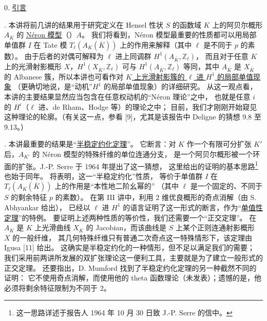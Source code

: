 0. \underline{引言}

. 本讲将前几讲的结果用于研究定义在 Hensel 性状 $S$ 的函数域 $K$ 上的阿贝尔概形 $A_K$ 的
\underline{N\'eron 模型}（）$A$。
我们将看到，N\'eron 模型最重要的性质都可以用局部单值群 $I$ 在 Tate 模
$T_\ell(A_K(\overline K))$ 上的作用来解释（其中 $\ell$ 是不同于 $p$ 的素数）。
由于后者的对偶可解释为 $\ell$ 进上同调群 $H^1(A_{\overline K},\mathbb Z_\ell)$，
而且对于任意 $K$ 上的光滑射影概形 $X$，$H^1(X_{\overline K},\mathbb Z_\ell)$
可与 $H^1(A_{\overline K},\mathbb Z_\ell)$ 等同，其中 $A_{\overline K}$ 是
$X_{\overline K}$ 的 Albanese 簇，所以本讲也可看作对
\underline{$K$ 上光滑射影簇的 $\ell$ 进 $H^1$ 的局部单值现象}
（更确切地说，是“动机”$H^1$ 的局部单值现象）的详细研究。
从这一观点看，本讲的主要结果显然应当包含在任意权动机的“N\'eron 理论”之中，
也就是任意 $i$ 的 $H^i$（$\ell$ 进、de Rham、Hodge 等）的理论之中；
目前，我们才刚刚开始窥见这种理论的轮廓。（有关这一点，参看 [9]，尤其是该报告中 Deligne 的猜想 9.8 至 9.13。）

. 本讲最重要的结果是“\underline{半稳定约化定理}”。
它断言：对 $K$ 作一个有限可分扩张 $K'$ 后，$A_{K'}$ 的 N\'eron 模型的特殊纤维的单位连通分支，
是一个阿贝尔概形被一个环面的扩张。J.-P. Serre 于 1964 年提出了这一猜想，
这里给出的证明的基本思路\footnote{这一思路详述于报告人 1964 年 10 月 30 日致 J.-P. Serre 的信中。}
也始于同年。 将表明，这一“半稳定约化”性质，
等价于单值群 $I$ 在 $T_\ell(A_K(\overline K))$ 上的作用是“本性地二阶幺幂的”
（其中 $\ell$ 是一个固定的、不同于 $S$ 的剩余特征 $p$ 的素数）。
在第 III 讲中，利用 $2$ 维优良概形的奇点消解（由 S. Abhyankar 给出），
已经以 $\ell$ 进 $H^1$ 的语言证明了这一形式的断言，作为“\underline{单值性定理}”的特例。
要证明上述两种性质的等价性，我们还需要一个“正交定理”。
在 $A_K$ 是 $K$ 上光滑曲线 $X_K$ 的 Jacobian，而该曲线是 $S$ 上某个正则连通射影概形 $X$ 的一般纤维，
其几何特殊纤维只有普通二次奇点这一特殊情形下，该定理由 Igusa [11] 给出。
这确实是半稳定约化的一种情形，但不足以满足我们的需要；
我们采用前两讲所发展的双扩张理论这一便利工具，主要就是为了建立一般形式的正交定理。
还要指出，D. Mumford 找到了半稳定约化定理的另一种截然不同的证明：
它不使用奇点消解，而使用他的 theta 函数理论（未发表）；遗憾的是，他必须将剩余特征限制为不同于 $2$。

